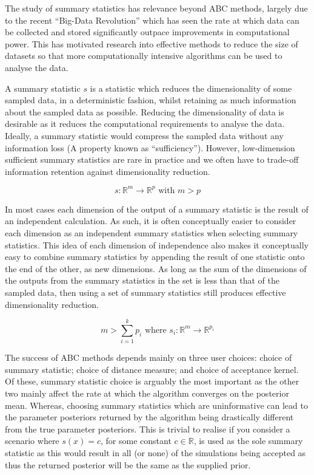 \documentclass[11pt,a4paper]{article}
\theoremstyle{break}
\begin{document}
  \par The study of summary statistics has relevance beyond ABC methods, largely due to the recent ``Big-Data Revolution'' which has seen the rate at which data can be collected and stored significantly outpace improvements in computational power. This has motivated research into effective methods to reduce the size of datasets so that more computationally intensive algorithms can be used to analyse the data. %

  \par A summary statistic $s$ is a statistic which reduces the dimensionality of some sampled data, in a deterministic fashion, whilst retaining as much information about the sampled data as possible. Reducing the dimensionality of data is desirable as it reduces the computational requirements to analyse the data. Ideally, a summary statistic would compress the sampled data without any information loss (A property known as ``sufficiency''). However, low-dimension sufficient summary statistics are rare in practice and we often have to trade-off information retention against dimensionality reduction.

  \[ s:\mathbb{R}^m\to\mathbb{R}^p\text{ with }m>p \]

  \par In most cases each dimension of the output of a summary statistic is the result of an independent calculation. As such, it is often conceptually easier to consider each dimension as an independent summary statistics when selecting summary statistics. This idea of each dimension of independence also makes it conceptually easy to combine summary statistics by appending the result of one statistic onto the end of the other, as new dimensions. %
  As long as the sum of the dimensions of the outputs from the summary statistics in the set is less than that of the sampled data, then using a set of summary statistics still produces effective dimensionality reduction.

  \[ m>\sum_{i=1}^kp_i\text{ where }s_i:\mathbb{R}^m\to\mathbb{R}^{p_i} \]

  The success of ABC methods depends mainly on three user choices: choice of summary statistic; choice of distance measure; and choice of acceptance kernel. Of these, summary statistic choice is arguably the most important as the other two mainly affect the rate at which the algorithm converges on the posterior mean. Whereas, choosing summary statistics which are uninformative can lead to the parameter posteriors returned by the algorithm being drastically different from the true parameter posteriors. This is trivial to realise if you consider a scenario where $s(x)=c$, for some constant $c\in\mathbb{R}$, is used as the sole summary statistic as this would result in all (or none) of the simulations being accepted as thus the returned posterior will be the same as the supplied prior.
\end{document}
